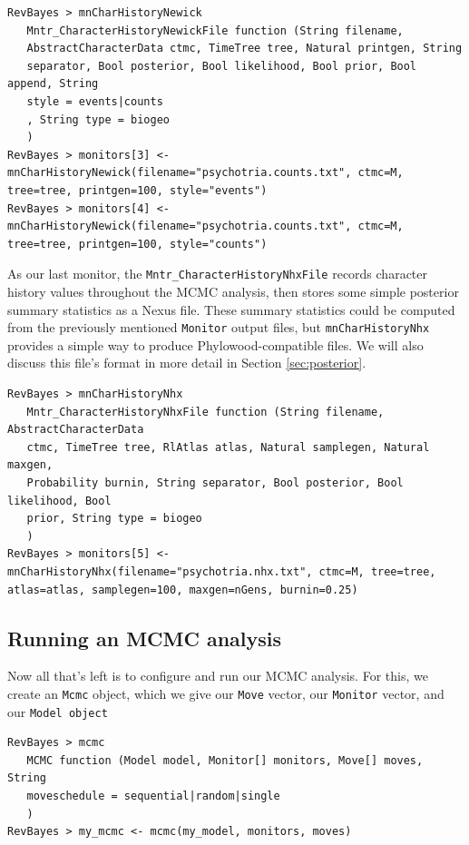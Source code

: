 \documentclass[11pt]{article}
\begin{document}
\begin{snugshade}
\begin{lstlisting}
RevBayes > mnCharHistoryNewick
   Mntr_CharacterHistoryNewickFile function (String filename,
   AbstractCharacterData ctmc, TimeTree tree, Natural printgen, String
   separator, Bool posterior, Bool likelihood, Bool prior, Bool append, String
   style = events|counts
   , String type = biogeo
   )
RevBayes > monitors[3] <- mnCharHistoryNewick(filename="psychotria.counts.txt", ctmc=M, tree=tree, printgen=100, style="events")
RevBayes > monitors[4] <- mnCharHistoryNewick(filename="psychotria.counts.txt", ctmc=M, tree=tree, printgen=100, style="counts")
\end{lstlisting}
\end{snugshade}

As our last monitor, the {\tt Mntr\_CharacterHistoryNhxFile} records character history values throughout the MCMC analysis, then stores some simple posterior summary statistics as a Nexus file.
These summary statistics could be computed from the previously mentioned {\tt Monitor} output files, but {\tt mnCharHistoryNhx} provides a simple way to produce Phylowood-compatible files.
We will also discuss this file's format in more detail in Section \ref{sec:posterior}.

\begin{snugshade}
\begin{lstlisting}
RevBayes > mnCharHistoryNhx
   Mntr_CharacterHistoryNhxFile function (String filename, AbstractCharacterData
   ctmc, TimeTree tree, RlAtlas atlas, Natural samplegen, Natural maxgen,
   Probability burnin, String separator, Bool posterior, Bool likelihood, Bool
   prior, String type = biogeo
   )
RevBayes > monitors[5] <- mnCharHistoryNhx(filename="psychotria.nhx.txt", ctmc=M, tree=tree, atlas=atlas, samplegen=100, maxgen=nGens, burnin=0.25)
\end{lstlisting}
\end{snugshade}


\subsection{Running an MCMC analysis}

Now all that's left is to configure and run our MCMC analysis.
For this, we create an {\tt Mcmc} object, which we give our {\tt Move} vector, our {\tt Monitor} vector, and our {\tt Model object}

\begin{snugshade}
\begin{lstlisting}
RevBayes > mcmc
   MCMC function (Model model, Monitor[] monitors, Move[] moves, String
   moveschedule = sequential|random|single
   )
RevBayes > my_mcmc <- mcmc(my_model, monitors, moves)
\end{lstlisting}
\end{snugshade}
\end{document}
